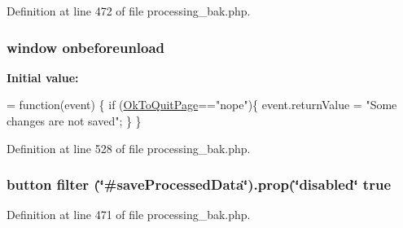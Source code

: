 Definition at line 472 of file processing\-\_\-bak.\-php.

\hypertarget{obsolete_2processing__bak_8php_a12dd03abd8fa9daa2fe8eaeb9c9682c3}{
\subsubsection[{onbeforeunload}]{\setlength{\rightskip}{0pt plus 5cm}window onbeforeunload}}\label{obsolete_2processing__bak_8php_a12dd03abd8fa9daa2fe8eaeb9c9682c3}
{\bfseries Initial value\-:}
\begin{DoxyCode}
= \textcolor{keyword}{function}(event) \{
        \textcolor{keywordflow}{if} (\hyperlink{obsolete_2processing__bak_8php_a737a9dd58b5139e64ee8903b481e9aa8}{OkToQuitPage}==\textcolor{stringliteral}{"nope"})\{
            \textcolor{keyword}{event}.returnValue = \textcolor{stringliteral}{"Some changes are not saved"};
        \}
    \}
\end{DoxyCode}


Definition at line 528 of file processing\-\_\-bak.\-php.

\hypertarget{obsolete_2processing__bak_8php_ad85b26c88897c4f65b1a4930711a2e93}{
\subsubsection[{true}]{\setlength{\rightskip}{0pt plus 5cm}button filter (\char`\"{}\#save\-Processed\-Data\char`\"{}).prop(\char`\"{}disabled\char`\"{} true}}\label{obsolete_2processing__bak_8php_ad85b26c88897c4f65b1a4930711a2e93}


Definition at line 471 of file processing\-\_\-bak.\-php.

